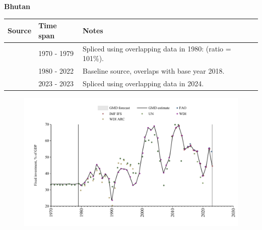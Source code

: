\documentclass[12pt,a4paper,landscape]{article}
\begin{document}
\begin{adjustbox}{max totalsize={\paperwidth}{\paperheight},center}
\begin{minipage}[t][\textheight][t]{\textwidth}
\vspace*{0.5cm}
{}
\begin{center}
{\Large\bfseries Bhutan}
\end{center}
\vspace{0.5cm}
\begin{table}[H]
\centering
\small
\begin{tabular}{|l|l|l|}
\hline
\textbf{Source} & \textbf{Time span} & \textbf{Notes} \\
\hline
\rowcolor{white}\cite{UN}& 1970 - 1979 &Spliced using overlapping data in 1980: (ratio = 101\%).\\
\rowcolor{lightgray}\cite{WDI}& 1980 - 2022 &Baseline source, overlaps with base year 2018.\\
\rowcolor{white}\cite{IMF_IFS}& 2023 - 2023 &Spliced using overlapping data in 2024.\\
\hline
\end{tabular}
\end{table}
\begin{figure}[H]
\centering
\includegraphics[width=\textwidth,height=0.6\textheight,keepaspectratio]{graphs/BTN_finv_GDP.pdf}
\end{figure}
\end{minipage}
\end{adjustbox}
\end{document}
